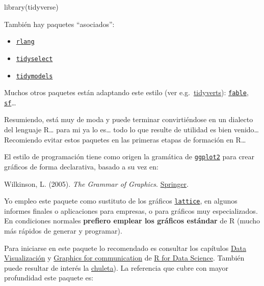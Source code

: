 \documentclass[
]{book}
\newenvironment{Shaded}{\begin{snugshade}}{\end{snugshade}}
\newcommand{\FunctionTok}[1]{\textcolor[rgb]{0.00,0.00,0.00}{#1}}
\newcommand{\NormalTok}[1]{#1}
\providecommand{\tightlist}{%
  \setlength{\itemsep}{0pt}\setlength{\parskip}{0pt}}
\theoremstyle{break}
\theoremstyle{nonumberplain}
\begin{document}
\begin{Shaded}
\begin{Highlighting}[]
\FunctionTok{library}\NormalTok{(tidyverse)}
\end{Highlighting}
\end{Shaded}

También hay paquetes ``asociados'':

\begin{itemize}
\tightlist
\item
  \href{https://rlang.r-lib.org}{\texttt{rlang}}
\item
  \href{https://tidyselect.r-lib.org}{\texttt{tidyselect}}
\item
  \href{https://tidymodels.tidymodels.org}{\texttt{tidymodels}}
\end{itemize}

Muchos otros paquetes están adaptando este estilo (ver e.g.~\href{https://tidyverts.org/}{tidyverts}): \href{https://fable.tidyverts.org}{\texttt{fable}}, \href{https://r-spatial.github.io/sf/}{\texttt{sf}}\ldots{}

Resumiendo, está muy de moda y puede terminar convirtiéndose en un dialecto del lenguaje R\ldots{} para mi ya lo es\ldots{} todo lo que resulte de utilidad es bien venido\ldots{} Recomiendo evitar estos paquetes en las primeras etapas de formación en R\ldots{}

El estilo de programación tiene como origen la gramática de \href{https://ggplot2.tidyverse.org}{\texttt{ggplot2}} para crear gráficos de forma declarativa, basado a su vez en:

Wilkinson, L. (2005). \emph{The Grammar of Graphics}. \href{https://www.google.es/books/edition/The_Grammar_of_Graphics/YGgUswEACAAJ?hl=es}{Springer}.

Yo empleo este paquete como sustituto de los gráficos \href{http://lattice.r-forge.r-project.org/}{\texttt{lattice}}, en algunos informes finales o aplicaciones para empresas, o para gráficos muy especializados.
En condiciones normales \textbf{prefiero emplear los gráficos estándar} de R (mucho más rápidos de generar y programar).

Para iniciarse en este paquete lo recomendado es consultar los capítulos \href{https://r4ds.had.co.nz/data-visualisation.html}{Data Visualización} y \href{https://r4ds.had.co.nz/graphics-for-communication.html}{Graphics for communication} de \href{https://r4ds.had.co.nz}{R for Data Science}.
También puede resultar de interés la \href{https://github.com/rstudio/cheatsheets/blob/master/data-visualization.pdf}{chuleta}).
La referencia que cubre con mayor profundidad este paquete es:
\end{document}
